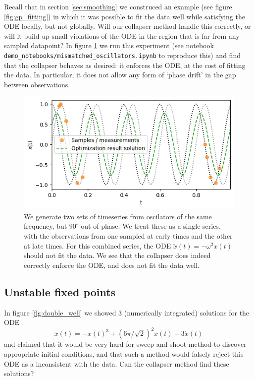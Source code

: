 \documentclass{article}
\begin{document}
Recall that in section \ref{sec:smoothing} we construced an example (see figure \ref{fig:gp_fitting}) in which it was possible to fit the data well while satisfying the ODE locally, but not globally.
Will our collapser method handle this correctly, or will it build up small violations of the ODE in the region that is far from any sampled datapoint?
In figure \ref{fig:mismatched_oscillators} we run this experiment (see notebook \texttt{demo\_notebooks/mismatched\_oscillators.ipynb} to reproduce this) and find that the collapser behaves as desired: it enforces the ODE, at the cost of fitting the data.
In particular, it does not allow any form of `phase drift' in the gap between observations.

\begin{figure}
\includegraphics{images/results/mismatched_oscillators.png}
\centering
\caption{
We generate two sets of timeseries from oscilators of the same frequency, but $90^{\circ}$ out of phase.
We treat these as a single series, with the observations from one sampled at early times and the other at late times.
For this combined series, the ODE $\ddot{x}(t) = - \omega^2 x(t)$ should not fit the data.
We see that the collapser does indeed correctly enforce the ODE, and does not fit the data well.
}
\label{fig:mismatched_oscillators}
\end{figure}

\subsection{Unstable fixed points}

In figure \ref{fig:double_well} we showed 3 (numerically integrated) solutions for the ODE
$$
\ddot{x}(t) = - x(t)^3 + (6\pi/\sqrt{2})^2 x(t) - 3 \dot{x}(t)
$$
and claimed that it would be very hard for sweep-and-shoot method to discover appropriate initial conditions, and that such a method would falsely reject this ODE as a inconsistent with the data.
Can the collapser method find these solutions?
\end{document}

